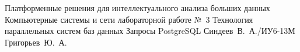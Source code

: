 \makereporttitle
{Платформенные решения для интеллектуального анализа больших данных}
{Компьютерные системы и сети}
{лабораторной работе №~3}
{Технология параллельных систем баз данных}
{Запросы PostgreSQL}
{}
{Синдеев~В.~А./ИУ6-13М}
{Григорьев~Ю.~А.}

\newpage